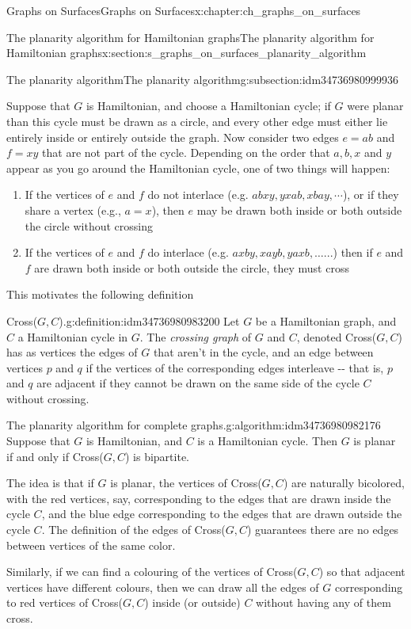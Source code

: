 \documentclass[oneside,10pt,]{book}
\numberwithin{equation}{section}
\begin{document}
\begin{chapterptx}{Graphs on Surfaces}{}{Graphs on Surfaces}{}{}{x:chapter:ch_graphs_on_surfaces}
\begin{sectionptx}{The planarity algorithm for Hamiltonian graphs}{}{The planarity algorithm for Hamiltonian graphs}{}{}{x:section:s_graphs_on_surfaces_planarity_algorithm}
\begin{subsectionptx}{The planarity algorithm}{}{The planarity algorithm}{}{}{g:subsection:idm34736980999936}
\par
Suppose that \(G\) is Hamiltonian, and choose a Hamiltonian cycle; if \(G\) were planar than this cycle must be drawn as a circle, and every other edge must either lie entirely inside or entirely outside the graph.  Now consider two edges \(e=ab\) and \(f=xy\) that are not part of the cycle.  Depending on the order that \(a,b,x\) and \(y\) appear as you go around the Hamiltonian cycle, one of two things will happen:%
\begin{enumerate}
\item{}If the vertices of \(e\) and \(f\) do not interlace (e.g. \(abxy, yxab, xbay,\cdots\)), or if they share a vertex (e.g., \(a=x\)), then \(e\) may be drawn both inside or both outside the circle without crossing%
\item{}If the vertices of \(e\) and \(f\) do interlace (e.g. \(axby, xayb, yaxb,\dots...\)) then if \(e\) and \(f\) are drawn both inside or both outside the circle, they must cross%
\end{enumerate}
%
\par
This motivates the following definition%
\begin{definition}{Cross(\(G,C\)).}{g:definition:idm34736980983200}%
Let \(G\) be a Hamiltonian graph, and \(C\) a Hamiltonian cycle in \(G\).  The \emph{crossing graph} of \(G\) and \(C\), denoted Cross(\(G,C\)) has as vertices the edges of \(G\) that aren't in the cycle, and an edge between vertices \(p\) and \(q\) if the vertices of the corresponding edges interleave -{}-{} that is, \(p\) and \(q\) are adjacent if they cannot be drawn on the same side of the cycle \(C\) without crossing.%
\end{definition}
\begin{algorithm}{The planarity algorithm for complete graphs.}{}{g:algorithm:idm34736980982176}%
Suppose that \(G\) is Hamiltonian, and \(C\) is a Hamiltonian cycle.  Then \(G\) is planar if and only if Cross(\(G,C\)) is bipartite.%
\end{algorithm}
The idea is that if \(G\) is planar, the vertices of Cross(\(G,C\)) are naturally bicolored, with the red vertices, say, corresponding to the edges that are drawn inside the cycle \(C\), and the blue edge corresponding to the edges that are drawn outside the cycle \(C\).  The definition of the edges of Cross(\(G,C\)) guarantees there are no edges between vertices of the same color.%
\par
Similarly, if we can find a colouring of the vertices of Cross(\(G,C\)) so that adjacent vertices have different colours, then we can draw all the edges of \(G\) corresponding to red vertices of Cross(\(G,C\)) inside (or outside) \(C\) without having any of them cross.%

\end{subsectionptx}
\end{sectionptx}
\end{chapterptx}
\end{document}
